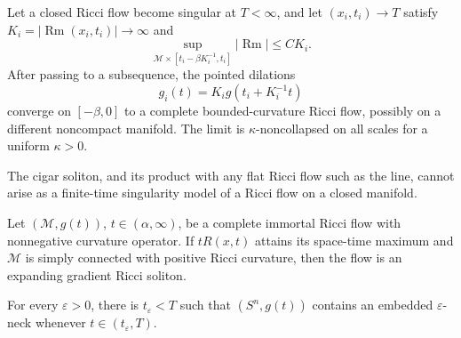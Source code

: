 \begin{corollary}
\label{cor:chow-ii-appd-obtaining-singularity-models}


Let a closed Ricci flow become singular at $T<\infty$, and let
$(x_i,t_i)\to T$ satisfy $K_i=|\operatorname{Rm}(x_i,t_i)|\to\infty$ and
\[
 \sup_{\mathcal M\times[t_i-\beta K_i^{-1},t_i]}
 |\operatorname{Rm}|\leq CK_i.
\]
After passing to a subsequence, the pointed dilations
\[
 g_i(t)=K_i g(t_i+K_i^{-1}t)
\]
converge on $[-\beta,0]$ to a complete bounded-curvature Ricci flow, possibly
on a different noncompact manifold. The limit is $\kappa$-noncollapsed on all
scales for a uniform $\kappa>0$.
\end{corollary}

\begin{corollary}
\label{cor:chow-ii-appd-cigar-not-singularity-model}


The cigar soliton, and its product with any flat Ricci flow such as the line,
cannot arise as a finite-time singularity model of a Ricci flow on a closed
manifold.
\end{corollary}

\begin{theorem}
\label{thm:chow-ii-appd-immortal-expanding-soliton}


Let $(\mathcal M,g(t))$, $t\in(\alpha,\infty)$, be a complete immortal Ricci
flow with nonnegative curvature operator. If $tR(x,t)$ attains its space-time
maximum and $\mathcal M$ is simply connected with positive Ricci curvature,
then the flow is an expanding gradient Ricci soliton.
\end{theorem}

\begin{proposition}
\label{prop:chow-ii-appd-embedded-epsilon-necks}
For every $\varepsilon>0$, there is $t_\varepsilon<T$ such that
$(S^n,g(t))$ contains an embedded $\varepsilon$-neck whenever
$t\in(t_\varepsilon,T)$.
\end{proposition}
